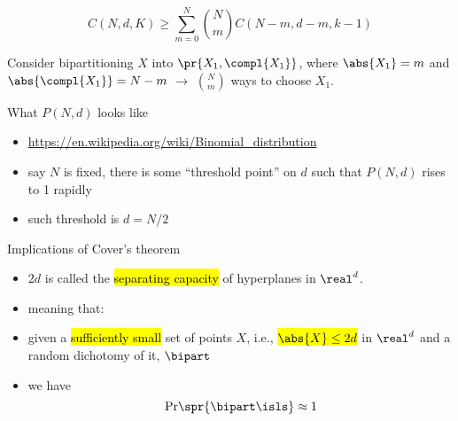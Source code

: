 \begin{frame}

  \begin{claim}
    \[C(N, d, K) \ge \sum_{m=0}^{N} {N \choose m} C(N-m, d-m, k-1)\]
  \end{claim}
  Consider bipartitioning $X$ into $\pr{X_1, \compl{X_1}}$, where $\abs{X_1}=m$ and $\abs{\compl{X_1}}=N-m$ $\longrightarrow$ ${N \choose m}$ ways to choose $X_1$.


\end{frame}  

\begin{frame}{What $P(N, d)$ looks like}
  \begin{itemize}[<+->]
  \item \url{https://en.wikipedia.org/wiki/Binomial\_distribution}
  \item {say $N$ is fixed, there is some ``threshold point'' on $d$ such that $P(N, d)$ rises to 1 rapidly}
  \item {such threshold is $d=N/2$}
  \end{itemize}
\end{frame}

\begin{frame}{Implications of Cover's theorem}
  \begin{itemize}[<+->]
  \item $2d$ is called the \hl{separating capacity} of hyperplanes in $\real^{d}$.
  \item[] meaning that:
  \item given a \hl{sufficiently small} set of points $X$, i.e., \hl{$\abs{X} \le 2 d$} in $\real^{d}$ and a random dichotomy of it, $\bipart$
  \item {we have
      \[
        \text{Pr}\spr{\bipart \isls } \approx 1
      \]
    }
  \end{itemize}
\end{frame}
